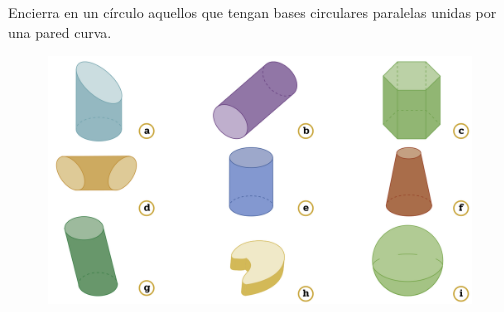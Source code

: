 \question[10] Encierra en un círculo aquellos que tengan bases circulares paralelas unidas por una pared curva.

\begin{figure}[H]
    \centering
    \includegraphics[width=\linewidth]{../images/20230319103014}
    \caption{}
    \label{fig:20230319103014}
\end{figure}